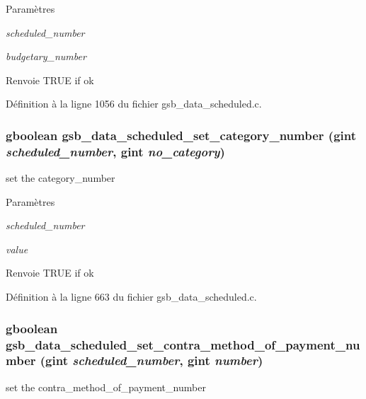 \begin{DoxyParams}{Paramètres}
\item[{\em scheduled\_\-number}]\item[{\em budgetary\_\-number}]\end{DoxyParams}
\begin{DoxyReturn}{Renvoie}
TRUE if ok 
\end{DoxyReturn}


Définition à la ligne 1056 du fichier gsb\_\-data\_\-scheduled.c.

\subsubsection[{gsb\_\-data\_\-scheduled\_\-set\_\-category\_\-number}]{\setlength{\rightskip}{0pt plus 5cm}gboolean gsb\_\-data\_\-scheduled\_\-set\_\-category\_\-number (gint {\em scheduled\_\-number}, \/  gint {\em no\_\-category})}\label{gsb__data__scheduled_8h_ad29b4497cacf9929c087ab5a84bcfc08}
set the category\_\-number


\begin{DoxyParams}{Paramètres}
\item[{\em scheduled\_\-number}]\item[{\em value}]\end{DoxyParams}
\begin{DoxyReturn}{Renvoie}
TRUE if ok 
\end{DoxyReturn}


Définition à la ligne 663 du fichier gsb\_\-data\_\-scheduled.c.

\subsubsection[{gsb\_\-data\_\-scheduled\_\-set\_\-contra\_\-method\_\-of\_\-payment\_\-number}]{\setlength{\rightskip}{0pt plus 5cm}gboolean gsb\_\-data\_\-scheduled\_\-set\_\-contra\_\-method\_\-of\_\-payment\_\-number (gint {\em scheduled\_\-number}, \/  gint {\em number})}\label{gsb__data__scheduled_8h_a8fcb6154f8ab3b51eb2c9aa99b4f4362}
set the contra\_\-method\_\-of\_\-payment\_\-number


